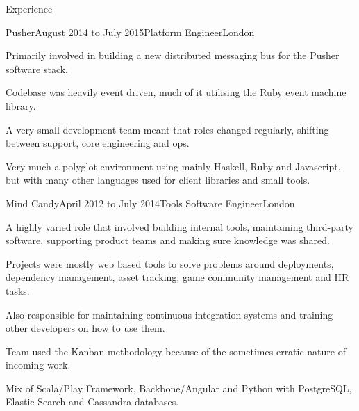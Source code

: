 \documentclass{resume} %
\begin{document}

\begin{rSection}{Experience}

  \begin{rExperience}{Pusher}{August 2014 to July 2015}{Platform Engineer}{London}
  \item Primarily involved in building a new distributed messaging bus for the Pusher software stack.
  \item Codebase was heavily event driven, much of it utilising the Ruby event machine library.
  \item A very small development team meant that roles changed regularly, shifting between support, core engineering and ops.
  \item Very much a polyglot environment using mainly Haskell, Ruby and Javascript, but with many other languages used for client libraries and small tools.
  \end{rExperience}


  \begin{rExperience}{Mind Candy}{April 2012 to July 2014}{Tools Software Engineer}{London}
  \item A highly varied role that involved building internal tools, maintaining third-party software, supporting product teams and making sure knowledge was shared.
  \item Projects were mostly web based tools to solve problems around deployments, dependency management, asset tracking, game community management and HR tasks.
  \item Also responsible for maintaining continuous integration systems and training other developers on how to use them.
  \item Team used the Kanban methodology because of the sometimes erratic nature of incoming work.
  \item Mix of Scala/Play Framework, Backbone/Angular and Python with PostgreSQL, Elastic Search and Cassandra databases.
  \end{rExperience}



\end{rSection}
\end{document}
